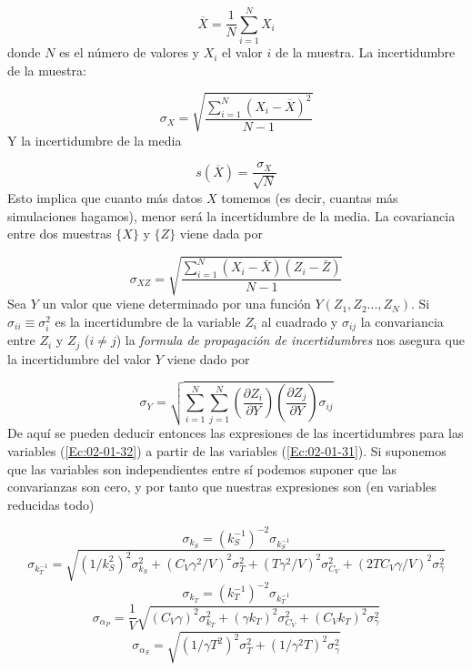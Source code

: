 \documentclass[11pt]{article} %
\newcommand{\parentesis}[1]{\left( #1  \right)}
\newcommand{\parciales}[2]{\frac{\partial #1}{\partial #2}}
\begin{document}
\begin{equation}
	 \overline{X} = \frac{1}{N}\sum_{i=1}^{N} X_i
\end{equation}
donde $N$ es el número de valores y $X_i$ el valor $i$ de la muestra. La incertidumbre de la muestra:

\begin{equation}
	\sigma_X = \sqrt{\frac{\sum_{i=1}^{N} \parentesis{X_i-\overline{X}}^2 }{N-1}}
\end{equation}
Y la incertidumbre de la media

\begin{equation}
	s(\overline{X}) = \frac{\sigma_X}{\sqrt{N}}
\end{equation}
Esto implica que cuanto más datos $X$ tomemos (es decir, cuantas más simulaciones hagamos), menor será la incertidumbre de la media. La covariancia entre dos muestras $\{ X \}$ y $\{ Z \}$ viene dada por 

\begin{equation}
	\sigma_{XZ} = \sqrt{ \frac{\sum_{i=1}^N (X_i-\bar{X})(Z_i-\bar{Z})}{N-1}}
\end{equation} 
Sea $Y$ un valor que viene determinado por una función $Y(Z_1,Z_2...,Z_N)$. Si $\sigma_{ii} \equiv \sigma_{i}^2$ es la incertidumbre de la variable $Z_i$ al cuadrado y $\sigma_{ij}$ la convariancia entre $Z_i$ y $Z_j$ ($i\neq j$) la \textit{formula de propagación de incertidumbres} nos asegura que la incertidumbre del valor $Y$ viene dado por

\begin{equation}
	\sigma_Y = \sqrt{\sum_{i=1}^N \sum_{j=1}^{N} \parentesis{\parciales{Z_i}{Y}}\parentesis{\parciales{Z_j}{Y}} \sigma_{ij} }
\end{equation} 
De aquí se pueden deducir entonces las expresiones de las incertidumbres para las variables (\ref{Ec:02-01-32}) a partir de las variables (\ref{Ec:02-01-31}). Si suponemos que las variables son independientes entre sí podemos suponer que las convarianzas son cero, y por tanto que nuestras expresiones son (en variables reducidas todo)

\begin{equation}
	\sigma_{k_S} = (k_S^{-1})^{-2} \sigma_{k_S^{-1}}
\end{equation}
\begin{equation}
	\sigma_{k_T^{-1}} =\sqrt{(1/k_S^2)^2 \sigma_{k_S}^2+ (C_V\gamma^2/V)^2 \sigma_{T}^2+ (T\gamma^2/V)^2 \sigma_{C_V}^2+ (2TC_V\gamma/V)^2 \sigma_{\gamma}^2}
\end{equation}
\begin{equation}
	\sigma_{k_T} = (k_T^{-1})^{-2} \sigma_{k_T^{-1}}
\end{equation}
\begin{equation}
	\sigma_{\alpha_P} = \frac{1}{V} \sqrt{(C_V\gamma)^2 \sigma_{k_T}^2+ (\gamma k_T)^2 \sigma_{C_V}^2 + (C_V k_T)^2 \sigma_{\gamma}^2}
\end{equation}
\begin{equation}
	\sigma_{\alpha_S} =\sqrt{(1/\gamma T^2)^2 \sigma_{T}^2+ (1/\gamma^2 T)^2 \sigma_{\gamma}^2}
\end{equation}
\end{document}
